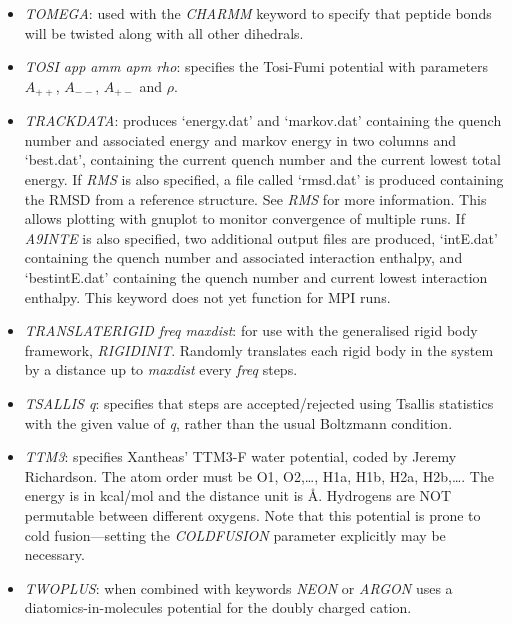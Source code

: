 \documentclass[12pt,a4paper,dvips]{article}
\begin{document}
\begin{itemize}
\item{\it TOMEGA}: used with the {\it CHARMM} keyword to specify that peptide bonds will be twisted along with all other dihedrals.


\item {\it TOSI app amm apm rho\/}: specifies the Tosi-Fumi potential\cite{tosif64}
with parameters $A_{++}$, $A_{--}$, $A_{+-}$ and $\rho$.

\item {\it TRACKDATA}: produces `energy.dat' and `markov.dat' containing the quench number and 
associated energy and markov energy in two columns and `best.dat', containing the current quench number and the current lowest
total energy. If {\it RMS\/} is also specified, a file called `rmsd.dat' is produced containing the RMSD from a reference structure.
See {\it RMS\/} for more information. This allows plotting with gnuplot to monitor convergence of multiple runs.
If {\it A9INTE} is also specified, two additional output files are produced, `intE.dat' containing the quench number and associated interaction
enthalpy, and `bestintE.dat' containing the quench number and current lowest interaction enthalpy. This keyword does not yet function for MPI runs.

\item {\it TRANSLATERIGID freq maxdist}: for use with the generalised rigid
body framework, {\it RIGIDINIT}. Randomly translates each rigid body in the
system by a distance up to {\it maxdist} every {\it freq} steps.

\item {\it TSALLIS q\/}: specifies that steps are accepted/rejected using Tsallis statistics with the
given value of {\it q\/}, rather than the usual Boltzmann condition.

\item {\it TTM3\/}: specifies Xantheas' TTM3-F water potential, coded
by Jeremy Richardson.
The atom order must be O1, O2,\ldots, H1a, H1b, H2a, H2b,\ldots.
The energy is in kcal/mol and the distance unit is \AA.
Hydrogens are NOT permutable between different oxygens.
Note that this potential is prone to cold fusion---setting the {\it COLDFUSION\/}
parameter explicitly may be necessary.

\item {\it TWOPLUS\/}: when combined with keywords {\it NEON\/} or {\it ARGON\/}
uses a diatomics-in-molecules potential for the doubly charged cation.


\end{itemize}
\end{document}
